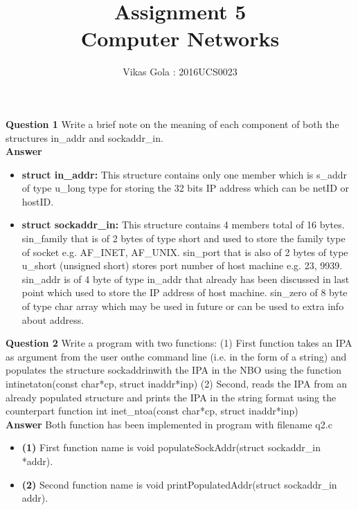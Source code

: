 \documentclass[14pt]{extarticle}
\begin{document}
    \pagestyle{plain}

    \title{\Huge Assignment 5\\ Computer Networks}
    \author{\huge Vikas Gola : 2016UCS0023}
    \maketitle
    \newpage

    \noindent
    \textbf{\large Question 1}
    Write a brief note on the meaning of each component of both the structures in\_addr and sockaddr\_in.\\[10pt]
    \textbf{\large Answer}
    \begin{itemize}
        \item \textbf{struct in\_addr:} This structure contains only one member which is s\_addr of type u\_long type
        for storing the 32 bits IP address which can be netID or hostID.
        \item \textbf{struct sockaddr\_in:} This structure contains 4 members total of 16 bytes. sin\_family that is of 2 bytes of type short and used to 
        store the family type of socket e.g. AF\_INET, AF\_UNIX. sin\_port that is also of 2 bytes of type u\_short (unsigned short) stores port number of
        host machine e.g. 23, 9939. sin\_addr is of 4 byte of type in\_addr that already has been discussed in last point which used to store the
        IP address of host machine. sin\_zero of 8 byte of type char array which may be used in future or can be used to extra info about address.
    \end{itemize}
    \vspace{1cm}


    \noindent
    \textbf{\large Question 2}
    Write  a  program  with  two  functions:  
    (1)  First  function  takes  an  IPA  as  argument  from  the  user  onthe command line 
    (i.e.  in the form of a string) and populates the structure sockaddrinwith the IPA  in  the  NBO
    using  the  function  intinetaton(const char*cp, struct inaddr*inp) 
    (2) Second, reads the IPA from an already populated structure 
    and prints the IPA in the string format using the counterpart function int inet\_ntoa(const char*cp, struct inaddr*inp)\\[10pt]
    \textbf{\large Answer}
    Both function has been implemented in program with filename q2.c
    \begin{itemize}
        \item \textbf{(1)} First function name is \textsf{void populateSockAddr(struct sockaddr\_in *addr)}.
        \item \textbf{(2)} Second function name is \textsf{void printPopulatedAddr(struct sockaddr\_in addr)}.
    \end{itemize}
    \vspace{1cm}
\end{document}
